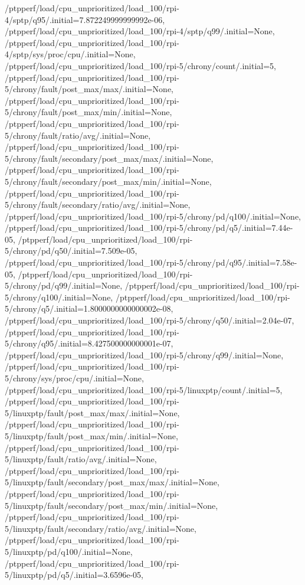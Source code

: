 {    /ptpperf/load/cpu_unprioritized/load_100/rpi-4/sptp/q95/.initial=7.872249999999992e-06,
    /ptpperf/load/cpu_unprioritized/load_100/rpi-4/sptp/q99/.initial=None,
    /ptpperf/load/cpu_unprioritized/load_100/rpi-4/sptp/sys/proc/cpu/.initial=None,
    /ptpperf/load/cpu_unprioritized/load_100/rpi-5/chrony/count/.initial=5,
    /ptpperf/load/cpu_unprioritized/load_100/rpi-5/chrony/fault/post_max/max/.initial=None,
    /ptpperf/load/cpu_unprioritized/load_100/rpi-5/chrony/fault/post_max/min/.initial=None,
    /ptpperf/load/cpu_unprioritized/load_100/rpi-5/chrony/fault/ratio/avg/.initial=None,
    /ptpperf/load/cpu_unprioritized/load_100/rpi-5/chrony/fault/secondary/post_max/max/.initial=None,
    /ptpperf/load/cpu_unprioritized/load_100/rpi-5/chrony/fault/secondary/post_max/min/.initial=None,
    /ptpperf/load/cpu_unprioritized/load_100/rpi-5/chrony/fault/secondary/ratio/avg/.initial=None,
    /ptpperf/load/cpu_unprioritized/load_100/rpi-5/chrony/pd/q100/.initial=None,
    /ptpperf/load/cpu_unprioritized/load_100/rpi-5/chrony/pd/q5/.initial=7.44e-05,
    /ptpperf/load/cpu_unprioritized/load_100/rpi-5/chrony/pd/q50/.initial=7.509e-05,
    /ptpperf/load/cpu_unprioritized/load_100/rpi-5/chrony/pd/q95/.initial=7.58e-05,
    /ptpperf/load/cpu_unprioritized/load_100/rpi-5/chrony/pd/q99/.initial=None,
    /ptpperf/load/cpu_unprioritized/load_100/rpi-5/chrony/q100/.initial=None,
    /ptpperf/load/cpu_unprioritized/load_100/rpi-5/chrony/q5/.initial=1.8000000000000002e-08,
    /ptpperf/load/cpu_unprioritized/load_100/rpi-5/chrony/q50/.initial=2.04e-07,
    /ptpperf/load/cpu_unprioritized/load_100/rpi-5/chrony/q95/.initial=8.427500000000001e-07,
    /ptpperf/load/cpu_unprioritized/load_100/rpi-5/chrony/q99/.initial=None,
    /ptpperf/load/cpu_unprioritized/load_100/rpi-5/chrony/sys/proc/cpu/.initial=None,
    /ptpperf/load/cpu_unprioritized/load_100/rpi-5/linuxptp/count/.initial=5,
    /ptpperf/load/cpu_unprioritized/load_100/rpi-5/linuxptp/fault/post_max/max/.initial=None,
    /ptpperf/load/cpu_unprioritized/load_100/rpi-5/linuxptp/fault/post_max/min/.initial=None,
    /ptpperf/load/cpu_unprioritized/load_100/rpi-5/linuxptp/fault/ratio/avg/.initial=None,
    /ptpperf/load/cpu_unprioritized/load_100/rpi-5/linuxptp/fault/secondary/post_max/max/.initial=None,
    /ptpperf/load/cpu_unprioritized/load_100/rpi-5/linuxptp/fault/secondary/post_max/min/.initial=None,
    /ptpperf/load/cpu_unprioritized/load_100/rpi-5/linuxptp/fault/secondary/ratio/avg/.initial=None,
    /ptpperf/load/cpu_unprioritized/load_100/rpi-5/linuxptp/pd/q100/.initial=None,
    /ptpperf/load/cpu_unprioritized/load_100/rpi-5/linuxptp/pd/q5/.initial=3.6596e-05,
}
